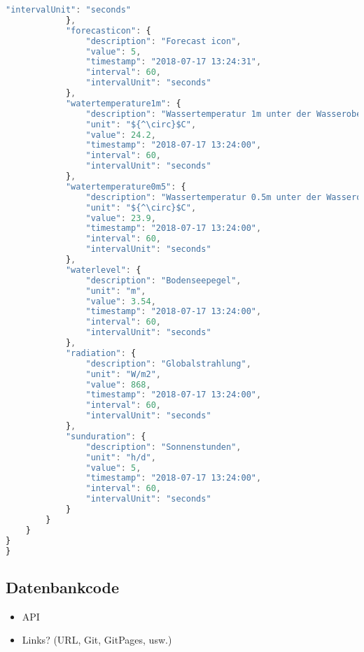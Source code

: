 \begin{lstlisting}[label=lst:JsonTree,caption=Json Struktur, language=JavaScript, style=htmlcssjs, mathescape]
                "intervalUnit": "seconds"
            },
            "forecasticon": {
                "description": "Forecast icon",
                "value": 5,
                "timestamp": "2018-07-17 13:24:31",
                "interval": 60,
                "intervalUnit": "seconds"
            },
            "watertemperature1m": {
                "description": "Wassertemperatur 1m unter der Wasseroberfläche",
                "unit": "${^\circ}$C",
                "value": 24.2,
                "timestamp": "2018-07-17 13:24:00",
                "interval": 60,
                "intervalUnit": "seconds"
            },
            "watertemperature0m5": {
                "description": "Wassertemperatur 0.5m unter der Wasseroberfläche",
                "unit": "${^\circ}$C",
                "value": 23.9,
                "timestamp": "2018-07-17 13:24:00",
                "interval": 60,
                "intervalUnit": "seconds"
            },
            "waterlevel": {
                "description": "Bodenseepegel",
                "unit": "m",
                "value": 3.54,
                "timestamp": "2018-07-17 13:24:00",
                "interval": 60,
                "intervalUnit": "seconds"
            },
            "radiation": {
                "description": "Globalstrahlung",
                "unit": "W/m2",
                "value": 868,
                "timestamp": "2018-07-17 13:24:00",
                "interval": 60,
                "intervalUnit": "seconds"
            },
            "sunduration": {
                "description": "Sonnenstunden",
                "unit": "h/d",
                "value": 5,
                "timestamp": "2018-07-17 13:24:00",
                "interval": 60,
                "intervalUnit": "seconds"
            }
        }
    }
}
}
\end{lstlisting}

\subsection{Datenbankcode}\label{anhang:Datenbankcode}
\begin{itemize}
	\item API
	\item Links? (URL, Git, GitPages, usw.)
\end{itemize}



